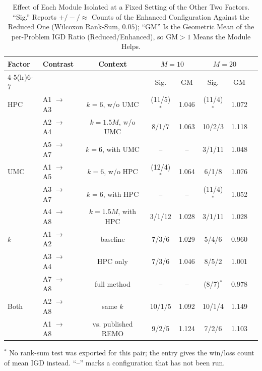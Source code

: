 \begin{table}[!t]
\centering
\caption{Effect of Each Module Isolated at a Fixed Setting of the Other
Two Factors. ``Sig.'' Reports $+/-/\approx$ Counts of the Enhanced
Configuration Against the Reduced One (Wilcoxon Rank-Sum, $0.05$); ``GM''
Is the Geometric Mean of the per-Problem IGD Ratio (Reduced/Enhanced),
so GM${}>1$ Means the Module Helps.}
\label{tab:abl_effect}
\renewcommand{\arraystretch}{1.15}
\setlength{\tabcolsep}{3.5pt}
\footnotesize
\begin{tabular}{llcccccc}
\toprule
\multirow{2}{*}{Factor} & \multirow{2}{*}{Contrast} & \multirow{2}{*}{Context}
  & \multicolumn{2}{c}{$M=10$} & \multicolumn{2}{c}{$M=20$} \\
\cmidrule(lr){4-5}\cmidrule(lr){6-7}
 & & & Sig. & GM & Sig. & GM \\
\midrule
HPC & A1 $\rightarrow$ A3 & $k=6$, w/o UMC & (11/5)$^{\ast}$ & 1.046 & (11/4)$^{\ast}$ & 1.072 \\
 & A2 $\rightarrow$ A4 & $k=1.5M$, w/o UMC & 8/1/7 & 1.063 & 10/2/3 & 1.118 \\
 & A5 $\rightarrow$ A7 & $k=6$, with UMC & -- & -- & 3/1/11 & 1.048 \\
\addlinespace[2pt]
UMC & A1 $\rightarrow$ A5 & $k=6$, w/o HPC & (12/4)$^{\ast}$ & 1.064 & 6/1/8 & 1.076 \\
 & A3 $\rightarrow$ A7 & $k=6$, with HPC & -- & -- & (11/4)$^{\ast}$ & 1.052 \\
 & A4 $\rightarrow$ A8 & $k=1.5M$, with HPC & 3/1/12 & 1.028 & 3/1/11 & 1.028 \\
\addlinespace[2pt]
$k$ & A1 $\rightarrow$ A2 & baseline & 7/3/6 & 1.029 & 5/4/6 & 0.960 \\
 & A3 $\rightarrow$ A4 & HPC only & 7/3/6 & 1.046 & 8/5/2 & 1.001 \\
 & A7 $\rightarrow$ A8 & full method & -- & -- & (8/7)$^{\ast}$ & 0.978 \\
\addlinespace[2pt]
Both & A2 $\rightarrow$ A8 & same $k$ & 10/1/5 & 1.092 & 10/1/4 & 1.149 \\
 & A1 $\rightarrow$ A8 & vs. published REMO & 9/2/5 & 1.124 & 7/2/6 & 1.103 \\
\bottomrule
\end{tabular}
\begin{flushleft}
\footnotesize $^{\ast}$ No rank-sum test was exported for this pair; the
entry gives the win/loss count of mean IGD instead. ``--'' marks a
configuration that has not been run.
\end{flushleft}
\end{table}

